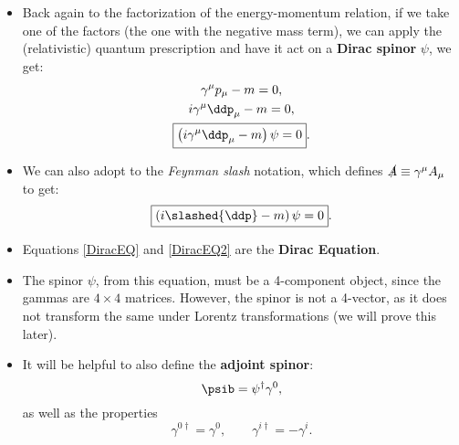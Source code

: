 \begin{itemize}
    \item Back again to the factorization of the energy-momentum relation, if we take one of the factors (the one with the negative mass term), we can apply the (relativistic) quantum prescription and have it act on a \textbf{Dirac spinor} $\psi$, we get:
        \begin{gather}
            \gamma^{\mu}p_{\mu} - m = 0, \\
            i\gamma^{\mu}\ddp_{\mu} - m = 0, \\
            \boxed{\left(i\gamma^{\mu}\ddp_{\mu} - m\right)\psi = 0}.\label{DiracEQ}
        \end{gather}
    \item We can also adopt to the \textit{Feynman slash} notation, which defines $\slashed{A} \equiv \gamma^{\mu}A_{\mu}$ to get:
        \begin{equation}
            \boxed{\left(i\slashed{\ddp} - m\right)\psi = 0}.\label{DiracEQ2}
        \end{equation}
    \item Equations \eqref{DiracEQ} and \eqref{DiracEQ2} are the \textbf{Dirac Equation}.
    \item The spinor $\psi$, from this equation, must be a 4-component object, since the gammas are $4\times4$ matrices. However, the spinor is not a 4-vector, as it does not transform the same under Lorentz transformations (we will prove this later).
    \item It will be helpful to also define the \textbf{adjoint spinor}:
        \begin{equation}
            \psib = \psi^{\dagger}\gamma^0,\label{AdjointSpinor}
        \end{equation}
        as well as the properties
        \begin{equation}
            \gamma^{0\dagger} = \gamma^0,\qquad \gamma^{i\dagger} = -\gamma^i.\label{GammaDaggers}
        \end{equation}


\end{itemize}
